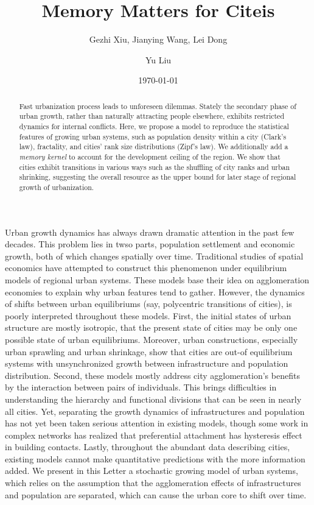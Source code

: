 \documentclass[reprint,unsortedaddress,amsmath,amssymb,aps,prl,showkeys]{revtex4-2}
\begin{document}
\title{Memory Matters for Citeis}
\author{Gezhi Xiu, Jianying Wang, Lei Dong}
\author{Yu Liu}
\date{\today}

\begin{abstract}
    Fast urbanization process leads to unforeseen dilemmas. Stately the secondary phase of urban growth, rather than naturally attracting people elsewhere, exhibits restricted dynamics for internal conflicts. Here, we propose a model to reproduce the statistical features of growing urban systems, such as population density within a city (Clark's law), fractality, and cities' rank size distributions (Zipf's law). We additionally add a \emph{memory kernel} to account for the development ceiling of the region. We show that cities exhibit transitions in various ways such as the shuffling of city ranks and urban shrinking, suggesting the overall resource as the upper bound for later stage of regional growth of urbanization.
\end{abstract}

\maketitle

Urban growth dynamics has always drawn dramatic attention in the past few decades. This problem lies in twso parts, population settlement and economic growth, both of which changes spatially over time. Traditional studies of spatial economics have attempted to construct this phenomenon under equilibrium models of regional urban systems\cite{batty1992form}. These models base their idea on agglomeration economies to explain why urban features tend to gather. However, the dynamics of shifts between urban equilibriums (say, polycentric transitions of cities), is poorly interpreted throughout these models. First, the initial states of urban structure are mostly isotropic, that the present state of cities may be only one possible state of urban equilibriums. Moreover, urban constructions, especially urban sprawling and urban shrinkage, show that cities are out-of equilibrium systems with unsynchronized growth between infrastructure and population distribution. Second, these models mostly address city agglomeration's benefits by the interaction between pairs of individuals. This brings difficulties in understanding the hierarchy and functional divisions that can be seen in nearly all cities. Yet, separating the growth dynamics of infrastructures and population has not yet been taken serious attention in existing models, though some work in complex networks has realized that preferential attachment has hysteresis effect in building contacts. Lastly, throughout the abundant data describing cities, existing models cannot make quantitative predictions with the more information added. We present in this Letter a stochastic growing model of urban systems, which relies on the assumption that the agglomeration effects of infrastructures and population are separated, which can cause the urban core to shift over time. 
\end{document}
